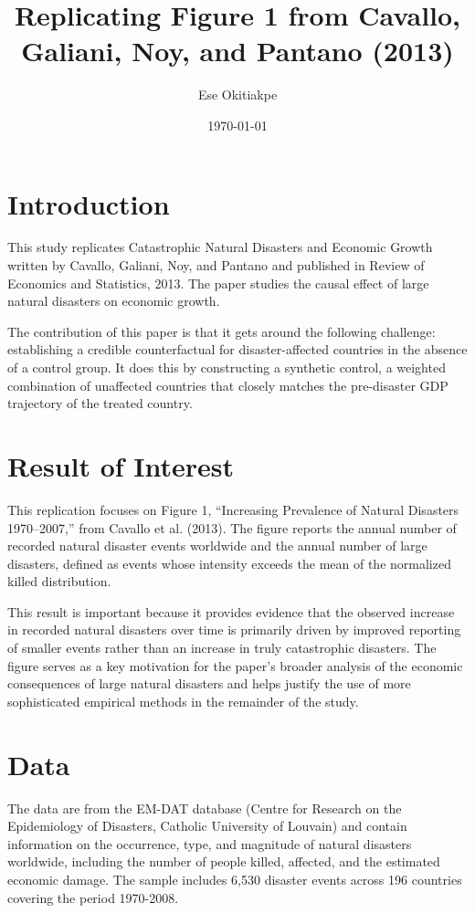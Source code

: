 \documentclass[12pt]{article}
\title{Replicating Figure 1 from Cavallo, Galiani, Noy, and Pantano (2013)}
\author{Ese Okitiakpe}
\date{\today}
\begin{document}
\maketitle

\section{Introduction}

This study replicates Catastrophic Natural Disasters and Economic Growth written by Cavallo, Galiani, Noy, and Pantano and published in Review of Economics and Statistics, 2013. The paper studies the causal effect of large natural disasters on economic growth\citep{cavallo2013}.

The contribution of this paper is that it gets around the following challenge: establishing a credible counterfactual for disaster-affected countries in the absence of a control group. It does this by constructing a synthetic control, a weighted combination of unaffected countries that closely matches the pre-disaster GDP trajectory of the treated country.

\section{Result of Interest}

This replication focuses on Figure 1, ``Increasing Prevalence of Natural Disasters 1970--2007,'' from Cavallo et al. (2013). The figure reports the annual number of recorded natural disaster events worldwide and the annual number of large disasters, defined as events whose intensity exceeds the mean of the normalized killed distribution.

This result is important because it provides evidence that the observed increase in recorded natural disasters over time is primarily driven by improved reporting of smaller events rather than an increase in truly catastrophic disasters. The figure serves as a key motivation for the paper's broader analysis of the economic consequences of large natural disasters and helps justify the use of more sophisticated empirical methods in the remainder of the study.


\section{Data}

The data are from the EM-DAT database (Centre for Research on the Epidemiology of Disasters, Catholic University of Louvain) and contain information on the occurrence, type, and magnitude of natural disasters worldwide, including the number of people killed, affected, and the estimated economic damage. The sample includes 6,530 disaster events across 196 countries covering the period 1970-2008.
\end{document}
